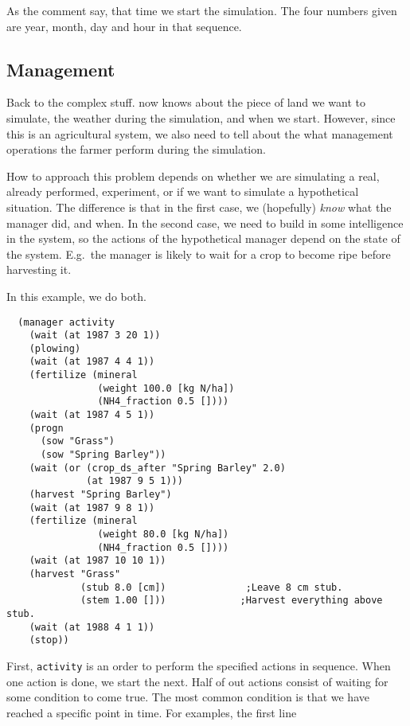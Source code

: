 \documentclass[a4paper,11pt]{article}
\begin{document}
As the comment say, that time we start the simulation.  The four
numbers given are year, month, day and hour in that sequence.

\subsection{Management}
\label{sec:ex-man}

Back to the complex stuff.  \Daisy{} now knows about the piece of land
we want to simulate, the weather during the simulation, and when we
start.  However, since this is an agricultural system, we also need to
tell \daisy{} about the what management operations the farmer perform
during the simulation.

How to approach this problem depends on whether we are simulating a
real, already performed, experiment, or if we want to simulate a
hypothetical situation.  The difference is that in the first case, we
(hopefully) \emph{know} what the manager did, and when.  In the second
case, we need to build in some intelligence in the system, so the
actions of the hypothetical manager depend on the state of the system.
E.g.\ the manager is likely to wait for a crop to become ripe before
harvesting it.

In this example, we do both.

\begin{verbatim}
  (manager activity
    (wait (at 1987 3 20 1))
    (plowing)
    (wait (at 1987 4 4 1))
    (fertilize (mineral
                (weight 100.0 [kg N/ha])
                (NH4_fraction 0.5 [])))
    (wait (at 1987 4 5 1))
    (progn
      (sow "Grass")
      (sow "Spring Barley"))
    (wait (or (crop_ds_after "Spring Barley" 2.0)
              (at 1987 9 5 1)))
    (harvest "Spring Barley")
    (wait (at 1987 9 8 1))
    (fertilize (mineral
                (weight 80.0 [kg N/ha])
                (NH4_fraction 0.5 [])))
    (wait (at 1987 10 10 1))
    (harvest "Grass"
             (stub 8.0 [cm])              ;Leave 8 cm stub.
             (stem 1.00 []))             ;Harvest everything above stub.
    (wait (at 1988 4 1 1))
    (stop))
\end{verbatim}

First, \texttt{activity} is an order to perform the specified actions
in sequence.  When one action is done, we start the next.  Half of out
actions consist of waiting for some condition to come true.  The most
common condition is that we have reached a specific point in time.
For examples, the first line
\end{document}

